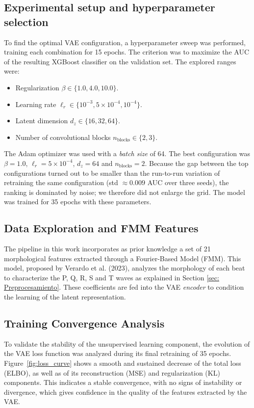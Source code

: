 \documentclass[11pt]{article}
\begin{document}
\subsection{Experimental setup and hyperparameter selection}
To find the optimal VAE configuration, a hyperparameter sweep was performed, training each combination for 15 epochs. The criterion was to maximize the AUC of the resulting XGBoost classifier on the validation set. The explored ranges were:
\begin{itemize}
    \item Regularization $\beta\in\{1.0, 4.0, 10.0\}$.
    \item Learning rate $\ell_r\in\{10^{-3}, 5\times10^{-4}, 10^{-4}\}$.
    \item Latent dimension $d_z\in\{16, 32, 64\}$.
    \item Number of convolutional blocks $n_{\mathrm{blocks}}\in\{2, 3\}$.
\end{itemize}
The Adam optimizer was used with a \textit{batch size} of 64. The best configuration was $\beta=1.0$, $\ell_r=5\times10^{-4}$, $d_z=64$ and $n_{\mathrm{blocks}}=2$. Because the gap between the top configurations turned out to be smaller than the run-to-run variation of retraining the same configuration (std $\approx 0.009$ AUC over three seeds), the ranking is dominated by noise; we therefore did not enlarge the grid. The model was trained for 35 epochs with these parameters.

\subsection{Data Exploration and FMM Features}
The pipeline in this work incorporates as prior knowledge a set of 21 morphological features extracted through a Fourier-Based Model (FMM). This model, proposed by Verardo et al. (2023), analyzes the morphology of each beat to characterize the P, Q, R, S and T waves as explained in Section \ref{sec: Preprocesamiento}.
These coefficients are fed into the VAE \textit{encoder} to condition the learning of the latent representation.

\vspace{3em}
\subsection{Training Convergence Analysis}
To validate the stability of the unsupervised learning component, the evolution of the VAE loss function was analyzed during its final retraining of 35 epochs. Figure~\ref{fig:loss_curve} shows a smooth and sustained decrease of the total loss (ELBO), as well as of its reconstruction (MSE) and regularization (KL) components. This indicates a stable convergence, with no signs of instability or divergence, which gives confidence in the quality of the features extracted by the VAE.
\end{document}
